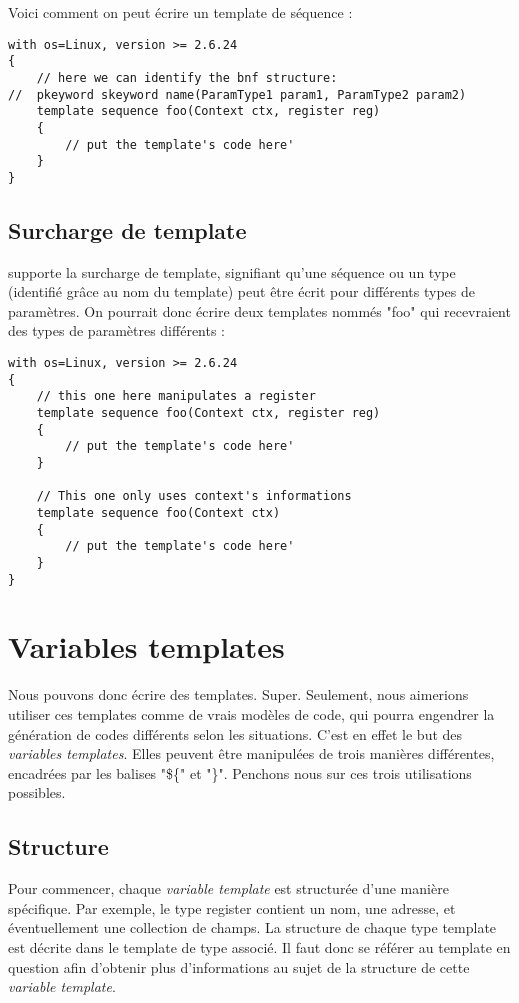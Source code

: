 \documentclass[french]{rtxreport}
\begin{document}
Voici comment on peut écrire un template de séquence :
\begin{lstlisting}
with os=Linux, version >= 2.6.24
{
    // here we can identify the bnf structure: 
//  pkeyword skeyword name(ParamType1 param1, ParamType2 param2)
    template sequence foo(Context ctx, register reg)
    {
        // put the template's code here'
    }
}
\end{lstlisting}

\section{Surcharge de template}

\rtx supporte la surcharge de template, signifiant qu'une séquence ou un type
(identifié grâce au nom du template) peut être écrit pour différents types de
paramètres. On pourrait donc écrire deux templates nommés "foo" qui recevraient
des types de paramètres différents :

\begin{lstlisting}
with os=Linux, version >= 2.6.24
{
    // this one here manipulates a register
    template sequence foo(Context ctx, register reg)
    {
        // put the template's code here'
    }

    // This one only uses context's informations
    template sequence foo(Context ctx)
    {
        // put the template's code here'
    }
}
\end{lstlisting}


\chapter{Variables templates}

Nous pouvons donc écrire des templates. Super. Seulement, nous aimerions
utiliser ces templates comme de vrais modèles de code, qui pourra engendrer la
génération de codes différents selon les situations. C'est en effet le but des
\emph{variables templates}. Elles peuvent être manipulées de trois manières
différentes, encadrées par les balises "\$\{" et "\}". Penchons nous sur ces
trois utilisations possibles.


\section{Structure}

Pour commencer, chaque \emph{variable template} est structurée d'une manière
spécifique. Par exemple, le type register contient un nom, une adresse, et
éventuellement une collection de champs. La structure de chaque type template
est décrite dans le template de type associé. Il faut donc se référer au
template en question afin d'obtenir plus d'informations au sujet de la
structure de cette \emph{variable template}.
\end{document}
